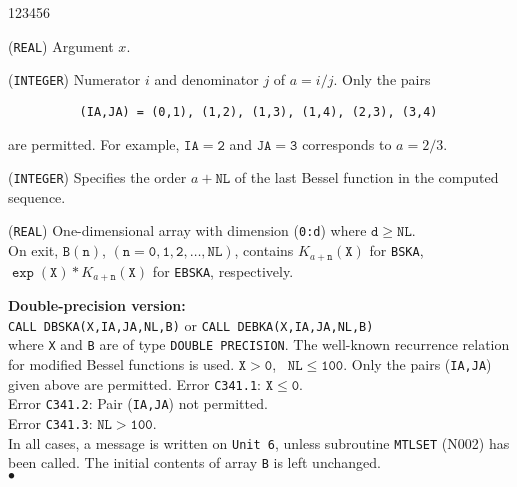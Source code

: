 \begin{DLtt}{123456}
\item[X] ({\tt REAL}) Argument $x$.
\item[IA,JA] ({\tt INTEGER}) Numerator $i$ and denominator $j$
of $a=i/j$. Only the pairs
\begin{verbatim}
          (IA,JA) = (0,1), (1,2), (1,3), (1,4), (2,3), (3,4)
\end{verbatim}
are permitted. For example,
$\mathtt{IA=2}$ and $\mathtt{JA=3}$ corresponds to $a=2/3$.
\item[NL] ({\tt INTEGER}) Specifies the order $a+\mathtt{NL}$ of
the last Bessel function in the computed sequence.
\item[B] ({\tt REAL}) One-dimensional array with dimension
({\tt 0:d}) where $\mathtt{d} \geq \mathtt{NL}$. \\
On exit, $\mathtt{B(n)}$, $\mathtt{(n = 0,1,2,\ldots,NL)}$,
contains $K_{a+\mathtt{n}}(\mathtt{X})$ for {\tt BSKA},
$\mathtt{\exp(X)*}K_{a+\mathtt{n}}(\mathtt{X})$ for {\tt EBSKA},
respectively.
\end{DLtt}
{\bf Double-precision version:} \\[2mm]
\hspace*{8mm} {\tt CALL DBSKA(X,IA,JA,NL,B)} \qquad or \qquad
              {\tt CALL DEBKA(X,IA,JA,NL,B)} \\[2mm]
where {\tt X} and {\tt B} are of type {\tt DOUBLE PRECISION}.
\Method
The well-known recurrence relation for modified Bessel functions
is used.
\Restrict
$\mathtt{X > 0}$, \ $\mathtt{NL \leq 100}$.
Only the pairs ({\tt IA,JA}) given above are permitted.
\newpage
\Errorh
Error {\tt C341.1}: $\mathtt{X \le 0}$.\\
Error {\tt C341.2}: Pair ({\tt IA,JA}) not permitted. \\
Error {\tt C341.3}: $\mathtt{NL>100}$. \\
In all cases, a message is written on
{\tt Unit 6}, unless subroutine {\tt MTLSET} (N002) has been called.
The initial contents of array {\tt B} is left unchanged. \\
$\bullet$
